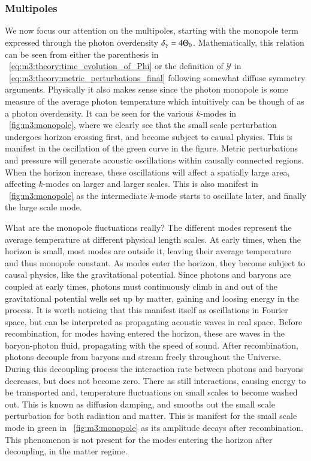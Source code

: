 \subsubsection{Multipoles}
    We now focus our attention on the multipoles, starting with the monopole term expressed through the photon overdensity $\delta_\gamma = 4\Theta_0$. Mathematically, this relation can be seen  from either the parenthesis in ~\cref{eq:m3:theory:time_evolution_of_Phi} or the definition of $\mathcal{Y}$ in ~\cref{eq:m3:theory:metric_perturbations_final} following somewhat diffuse symmetry arguments. Physically it also makes sense since the photon monopole is some measure of the average photon temperature which intuitively can be though of as a photon overdensity. It can be seen for the various $k$-modes in ~\cref{fig:m3:monopole}, where we clearly see that the small scale perturbation undergoes horizon crossing first, and become subject to causal physics. This is manifest in the oscillation of the green curve in the figure. Metric perturbations and pressure will generate acoustic oscillations within causally connected regions. When the horizon increase, these oscillations will affect a spatially large area, affecting $k$-modes on larger and larger scales. This is also manifest in ~\cref{fig:m3:monopole} as the intermediate $k$-mode starts to oscillate later, and finally the large scale mode. 

    What are the monopole fluctuations really? The different modes represent the average temperature at different physical length scales. At early times, when the horizon is small, most modes are outside it, leaving their average temperature and thus monopole constant. As modes enter the horizon, they become subject to causal physics, like the gravitational potential. Since photons and baryons are coupled at early times, photons must continuously climb in and out of the gravitational potential wells set up by matter, gaining and loosing energy in the process. It is worth noticing that this manifest itself as oscillations in Fourier space, but can be interpreted as propagating acoustic waves in real space. Before recombination, for modes having entered the horizon, these are waves in the baryon-photon fluid, propagating with the speed of sound. After recombination, photons decouple from baryons and stream freely throughout the Universe. During this decoupling process the interaction rate between photons and baryons decreases, but does not become zero. There as still interactions, causing energy to be transported and, temperature fluctuations on small scales to become washed out. This is known as diffusion damping, and smooths out the small scale perturbation for both radiation and matter. This is manifest for the small scale mode in green in ~\cref{fig:m3:monopole} as its amplitude decays after recombination. This phenomenon is not present for the modes entering the horizon after decoupling, in the matter regime. 

